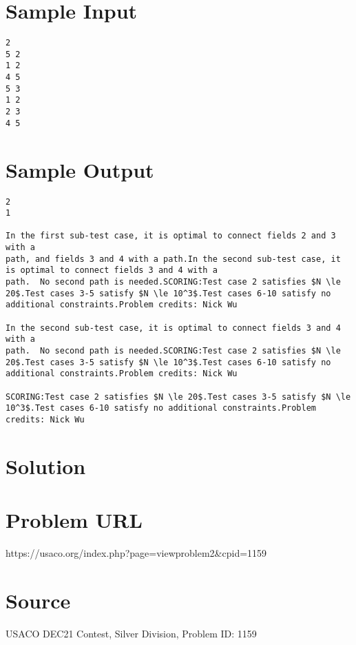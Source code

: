 \documentclass[12pt]{article}
\begin{document}
\section*{Sample Input}
\begin{verbatim}
2
5 2
1 2
4 5
5 3
1 2
2 3
4 5
\end{verbatim}

\section*{Sample Output}
\begin{verbatim}
2
1

In the first sub-test case, it is optimal to connect fields 2 and 3 with a 
path, and fields 3 and 4 with a path.In the second sub-test case, it is optimal to connect fields 3 and 4 with a
path.  No second path is needed.SCORING:Test case 2 satisfies $N \le 20$.Test cases 3-5 satisfy $N \le 10^3$.Test cases 6-10 satisfy no additional constraints.Problem credits: Nick Wu

In the second sub-test case, it is optimal to connect fields 3 and 4 with a
path.  No second path is needed.SCORING:Test case 2 satisfies $N \le 20$.Test cases 3-5 satisfy $N \le 10^3$.Test cases 6-10 satisfy no additional constraints.Problem credits: Nick Wu

SCORING:Test case 2 satisfies $N \le 20$.Test cases 3-5 satisfy $N \le 10^3$.Test cases 6-10 satisfy no additional constraints.Problem credits: Nick Wu
\end{verbatim}

\section*{Solution}


\section*{Problem URL}
https://usaco.org/index.php?page=viewproblem2&cpid=1159

\section*{Source}
USACO DEC21 Contest, Silver Division, Problem ID: 1159
\end{document}
